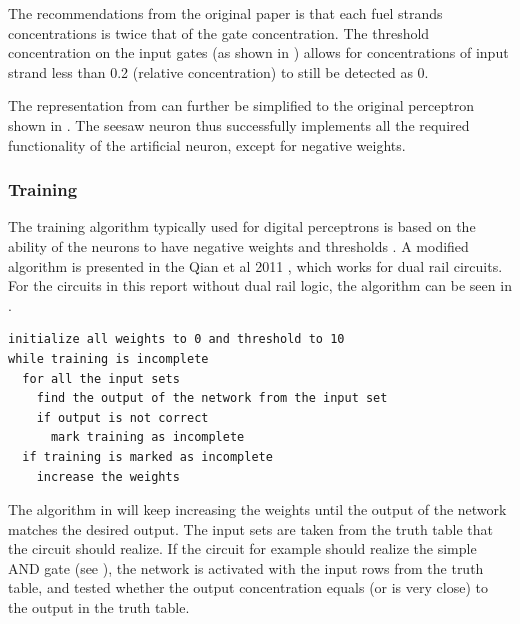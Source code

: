 The recommendations from the original paper \cite{Qian2011} is that each fuel strands concentrations is twice that of the gate concentration. The threshold concentration on the input gates (as shown in ) allows for concentrations of input strand less than 0.2 (relative concentration) to still be detected as 0.

The representation from  can further be simplified to the original perceptron shown in . The seesaw neuron thus successfully implements all the required functionality of the artificial neuron, except for negative weights.

\subsubsection{Training}
The training algorithm typically used for digital perceptrons is based on the ability of the neurons to have negative weights and thresholds \cite{Gallant1990}. A modified algorithm is presented in the Qian et al 2011 \cite{Qian2011}, which works for dual rail circuits. For the circuits in this report without dual rail logic, the algorithm can be seen in .

\begin{lstlisting}[float,floatplacement=h,caption=Pseudocode for the seesaw perceptron training algorithm, label=codetraining]
initialize all weights to 0 and threshold to 10
while training is incomplete
  for all the input sets
    find the output of the network from the input set
    if output is not correct
      mark training as incomplete
  if training is marked as incomplete
    increase the weights
\end{lstlisting}

The algorithm in  will keep increasing the weights until the output of the network matches the desired output. The input sets are taken from the truth table that the circuit should realize. If the circuit for example should realize the simple AND gate (see ), the network is activated with the input rows from the truth table, and tested whether the output concentration equals (or is very close) to the output in the truth table.

